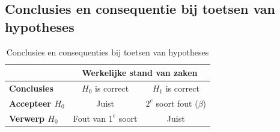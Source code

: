 \documentclass[a4paper,12pt]{article}
\begin{document}
\subsection{Conclusies en consequentie bij toetsen van hypotheses}
\begin{table}[H]
\centering
\begin{tabular}{l c c}

& \multicolumn{2}{c}{\textbf{Werkelijke stand van zaken}}\\
\hline
\textbf{Conclusies} & $H_0$ is correct & $H_1$ is correct \\
\textbf{Accepteer $H_0$} & Juist & $2^e$ soort fout ($\beta$)\\
\textbf{Verwerp $H_0$} & Fout van $1^e$ soort & Juist\\
\hline
\end{tabular}
\caption{Conclusies en consequenties bij toetsen van hypotheses}
\label{tab:conseqentiesToetsenHypotheses}
\end{table}
\end{document}
